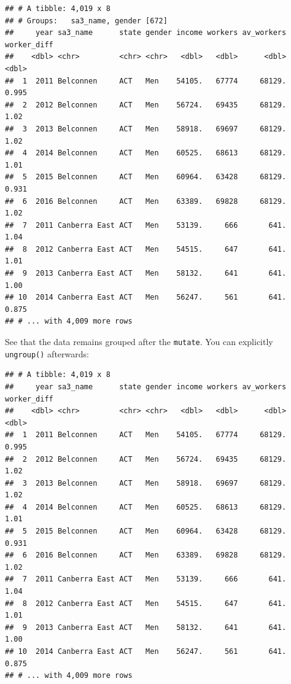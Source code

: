 \documentclass[]{book}
\newenvironment{Shaded}{\begin{snugshade}}{\end{snugshade}}
\newcommand{\DataTypeTok}[1]{\textcolor[rgb]{0.13,0.29,0.53}{#1}}
\newcommand{\KeywordTok}[1]{\textcolor[rgb]{0.13,0.29,0.53}{\textbf{#1}}}
\newcommand{\NormalTok}[1]{#1}
\newcommand{\OperatorTok}[1]{\textcolor[rgb]{0.81,0.36,0.00}{\textbf{#1}}}
\newcommand{\StringTok}[1]{\textcolor[rgb]{0.31,0.60,0.02}{#1}}
\begin{document}
\begin{verbatim}
## # A tibble: 4,019 x 8
## # Groups:   sa3_name, gender [672]
##     year sa3_name      state gender income workers av_workers worker_diff
##    <dbl> <chr>         <chr> <chr>   <dbl>   <dbl>      <dbl>       <dbl>
##  1  2011 Belconnen     ACT   Men    54105.   67774     68129.       0.995
##  2  2012 Belconnen     ACT   Men    56724.   69435     68129.       1.02 
##  3  2013 Belconnen     ACT   Men    58918.   69697     68129.       1.02 
##  4  2014 Belconnen     ACT   Men    60525.   68613     68129.       1.01 
##  5  2015 Belconnen     ACT   Men    60964.   63428     68129.       0.931
##  6  2016 Belconnen     ACT   Men    63389.   69828     68129.       1.02 
##  7  2011 Canberra East ACT   Men    53139.     666       641.       1.04 
##  8  2012 Canberra East ACT   Men    54515.     647       641.       1.01 
##  9  2013 Canberra East ACT   Men    58132.     641       641.       1.00 
## 10  2014 Canberra East ACT   Men    56247.     561       641.       0.875
## # ... with 4,009 more rows
\end{verbatim}

See that the data remains grouped after the \texttt{mutate}. You can explicitly \texttt{ungroup()} afterwards:

\begin{Shaded}
\end{Shaded}

\begin{verbatim}
## # A tibble: 4,019 x 8
##     year sa3_name      state gender income workers av_workers worker_diff
##    <dbl> <chr>         <chr> <chr>   <dbl>   <dbl>      <dbl>       <dbl>
##  1  2011 Belconnen     ACT   Men    54105.   67774     68129.       0.995
##  2  2012 Belconnen     ACT   Men    56724.   69435     68129.       1.02 
##  3  2013 Belconnen     ACT   Men    58918.   69697     68129.       1.02 
##  4  2014 Belconnen     ACT   Men    60525.   68613     68129.       1.01 
##  5  2015 Belconnen     ACT   Men    60964.   63428     68129.       0.931
##  6  2016 Belconnen     ACT   Men    63389.   69828     68129.       1.02 
##  7  2011 Canberra East ACT   Men    53139.     666       641.       1.04 
##  8  2012 Canberra East ACT   Men    54515.     647       641.       1.01 
##  9  2013 Canberra East ACT   Men    58132.     641       641.       1.00 
## 10  2014 Canberra East ACT   Men    56247.     561       641.       0.875
## # ... with 4,009 more rows
\end{verbatim}
\end{document}
